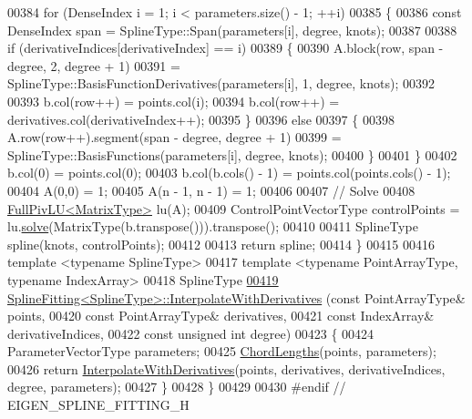 \begin{DoxyCode}
00384     \textcolor{keywordflow}{for} (DenseIndex i = 1; i < parameters.size() - 1; ++i)
00385     \{
00386       \textcolor{keyword}{const} DenseIndex span = SplineType::Span(parameters[i], degree, knots);
00387 
00388       \textcolor{keywordflow}{if} (derivativeIndices[derivativeIndex] == i)
00389       \{
00390         A.block(row, span - degree, 2, degree + 1)
00391           = SplineType::BasisFunctionDerivatives(parameters[i], 1, degree, knots);
00392 
00393         b.col(row++) = points.col(i);
00394         b.col(row++) = derivatives.col(derivativeIndex++);
00395       \}
00396       \textcolor{keywordflow}{else}
00397       \{
00398         A.row(row++).segment(span - degree, degree + 1)
00399           = SplineType::BasisFunctions(parameters[i], degree, knots);
00400       \}
00401     \}
00402     b.col(0) = points.col(0);
00403     b.col(b.cols() - 1) = points.col(points.cols() - 1);
00404     A(0,0) = 1;
00405     A(n - 1, n - 1) = 1;
00406     
00407     \textcolor{comment}{// Solve}
00408     \hyperlink{group___l_u___module_class_eigen_1_1_full_piv_l_u}{FullPivLU<MatrixType>} lu(A);
00409     ControlPointVectorType controlPoints = lu.\hyperlink{group___l_u___module_af563471f6f3283fd10779ef02dd0b748}{solve}(MatrixType(b.transpose())).transpose();
00410 
00411     SplineType spline(knots, controlPoints);
00412     
00413     \textcolor{keywordflow}{return} spline;
00414   \}
00415   
00416   \textcolor{keyword}{template} <\textcolor{keyword}{typename} SplineType>
00417   \textcolor{keyword}{template} <\textcolor{keyword}{typename} Po\textcolor{keywordtype}{int}ArrayType, \textcolor{keyword}{typename} IndexArray>
00418   SplineType
\hyperlink{group___splines___module_a7bd937fdcfa168dbdc27932886a4da9f}{00419}   \hyperlink{group___splines___module_a7bd937fdcfa168dbdc27932886a4da9f}{SplineFitting<SplineType>::InterpolateWithDerivatives}
      (\textcolor{keyword}{const} PointArrayType& points,
00420                                                         \textcolor{keyword}{const} PointArrayType& derivatives,
00421                                                         \textcolor{keyword}{const} IndexArray& derivativeIndices,
00422                                                         \textcolor{keyword}{const} \textcolor{keywordtype}{unsigned} \textcolor{keywordtype}{int} degree)
00423   \{
00424     ParameterVectorType parameters;
00425     \hyperlink{group___splines___module_ga1b4cbde5d98411405871accf877552d2}{ChordLengths}(points, parameters);
00426     \textcolor{keywordflow}{return} \hyperlink{group___splines___module_a7bd937fdcfa168dbdc27932886a4da9f}{InterpolateWithDerivatives}(points, derivatives, derivativeIndices, 
      degree, parameters);
00427   \}
00428 \}
00429 
00430 \textcolor{preprocessor}{#endif // EIGEN\_SPLINE\_FITTING\_H}
\end{DoxyCode}
